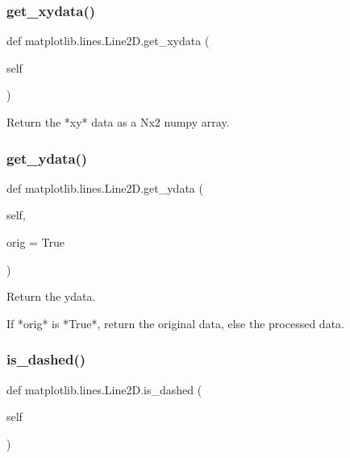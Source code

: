 \subsubsection{\texorpdfstring{get\+\_\+xydata()}{get\_xydata()}}
{\footnotesize\ttfamily def matplotlib.\+lines.\+Line2\+D.\+get\+\_\+xydata (\begin{DoxyParamCaption}\item[{}]{self }\end{DoxyParamCaption})}

\begin{DoxyVerb}Return the *xy* data as a Nx2 numpy array.
\end{DoxyVerb}
 \mbox{\label{classmatplotlib_1_1lines_1_1Line2D_a3ceae989db6514d08c16bec8633afc67}} 
\subsubsection{\texorpdfstring{get\+\_\+ydata()}{get\_ydata()}}
{\footnotesize\ttfamily def matplotlib.\+lines.\+Line2\+D.\+get\+\_\+ydata (\begin{DoxyParamCaption}\item[{}]{self,  }\item[{}]{orig = {\ttfamily True} }\end{DoxyParamCaption})}

\begin{DoxyVerb}Return the ydata.

If *orig* is *True*, return the original data, else the
processed data.
\end{DoxyVerb}
 \mbox{\label{classmatplotlib_1_1lines_1_1Line2D_a3b424d69cae73719e0b15e37af3a2bbd}} 
\subsubsection{\texorpdfstring{is\+\_\+dashed()}{is\_dashed()}}
{\footnotesize\ttfamily def matplotlib.\+lines.\+Line2\+D.\+is\+\_\+dashed (\begin{DoxyParamCaption}\item[{}]{self }\end{DoxyParamCaption})}

